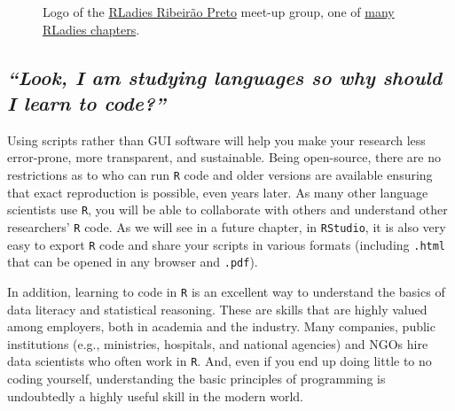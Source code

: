 \documentclass[
  letterpaper,
  DIV=11,
  numbers=noendperiod,
  oneside]{scrreprt}
\begin{document}
\begin{figure}


\caption{\label{fig-RLadies}Logo of the
\href{https://rladiesrp.github.io/}{RLadies Ribeirão Preto} meet-up
group, one of
\href{https://benubah.github.io/r-community-explorer/rladies.html}{many
RLadies chapters}.}

\end{figure}%

\subsection*{\texorpdfstring{\emph{``Look, I am studying languages so
why should I learn to code?''}
🤔}{``Look, I am studying languages so why should I learn to code?'' 🤔}}\label{look-i-am-studying-languages-so-why-should-i-learn-to-code}

Using scripts rather than GUI software will help you make your research
less error-prone, more transparent, and sustainable. Being open-source,
there are no restrictions as to who can run \texttt{R} code and older
versions are available ensuring that exact reproduction is possible,
even years later. As many other language scientists use \texttt{R}, you
will be able to collaborate with others and understand other
researchers' \texttt{R} code. As we will see in a future chapter, in
\texttt{RStudio}, it is also very easy to export \texttt{R} code and
share your scripts in various formats (including \texttt{.html} that can
be opened in any browser and \texttt{.pdf}).

In addition, learning to code in \texttt{R} is an excellent way to
understand the basics of data literacy and statistical reasoning. These
are skills that are highly valued among employers, both in academia and
the industry. Many companies, public institutions (e.g., ministries,
hospitals, and national agencies) and NGOs hire data scientists who
often work in \texttt{R}. And, even if you end up doing little to no
coding yourself, understanding the basic principles of programming is
undoubtedly a highly useful skill in the modern world.
\end{document}
